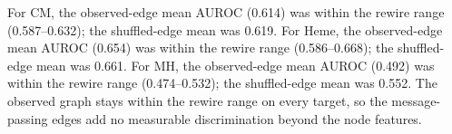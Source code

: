 For CM, the observed-edge mean AUROC (0.614) was within the rewire range (0.587--0.632); the shuffled-edge mean was 0.619. For Heme, the observed-edge mean AUROC (0.654) was within the rewire range (0.586--0.668); the shuffled-edge mean was 0.661. For MH, the observed-edge mean AUROC (0.492) was within the rewire range (0.474--0.532); the shuffled-edge mean was 0.552. The observed graph stays within the rewire range on every target, so the message-passing edges add no measurable discrimination beyond the node features.
